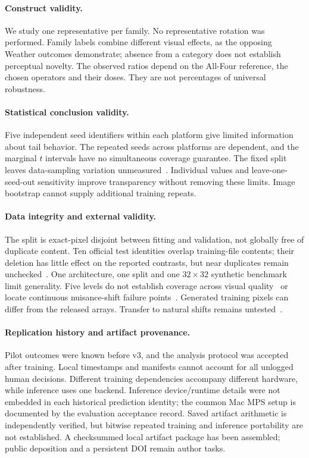 \documentclass[twoside,a4paper,11pt]{article}
\begin{document}
\paragraph{Construct validity.}
We study one representative per family. No representative rotation was performed. Family labels combine different visual effects, as the opposing Weather outcomes demonstrate; absence from a category does not establish perceptual novelty. The observed ratios depend on the All-Four reference, the chosen operators and their doses. They are not percentages of universal robustness.

\paragraph{Statistical conclusion validity.}
Five independent seed identifiers within each platform give limited information about tail behavior. The repeated seeds across platforms are dependent, and the marginal $t$ intervals have no simultaneous coverage guarantee. The fixed split leaves data-sampling variation unmeasured~\cite{bouthillier2021variance}. Individual values and leave-one-seed-out sensitivity improve transparency without removing these limits. Image bootstrap cannot supply additional training repeats.

\paragraph{Data integrity and external validity.}
The split is exact-pixel disjoint between fitting and validation, not globally free of duplicate content. Ten official test identities overlap training-file contents; their deletion has little effect on the reported contrasts, but near duplicates remain unchecked~\cite{barz2020duplicates}. One architecture, one split and one $32\times32$ synthetic benchmark limit generality. Five levels do not establish coverage across visual quality~\cite{shen2025continuous} or locate continuous nuisance-shift failure points~\cite{dunkel2025cns}. Generated training pixels can differ from the released arrays. Transfer to natural shifts remains untested~\cite{taori2020measuring}.

\paragraph{Replication history and artifact provenance.}
Pilot outcomes were known before v3, and the analysis protocol was accepted after training. Local timestamps and manifests cannot account for all unlogged human decisions. Different training dependencies accompany different hardware, while inference uses one backend. Inference device/runtime details were not embedded in each historical prediction identity; the common Mac MPS setup is documented by the evaluation acceptance record. Saved artifact arithmetic is independently verified, but bitwise repeated training and inference portability are not established. A checksummed local artifact package has been assembled; public deposition and a persistent DOI remain author tasks.
\end{document}
